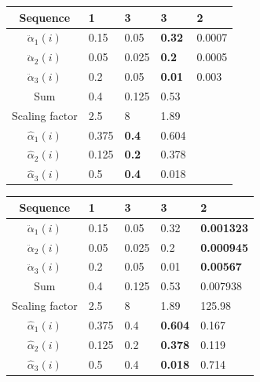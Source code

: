 \begin{frame}
\begin{table}[h]
\begin{tabular}{|c|l|l|l|l|}
 \hline
Sequence      & 1     & 3            & 3             & 2      \\ \hline
$\ddot{\alpha}_1(i)$          & 0.15  & 0.05         & \textbf{0.32} & 0.0007 \\ \hline
$\ddot{\alpha}_2(i)$          & 0.05  & 0.025        & \textbf{0.2}  & 0.0005 \\ \hline
$\ddot{\alpha}_3(i)$          & 0.2   & 0.05         & \textbf{0.01} & 0.003  \\ \hline
Sum            & 0.4   & 0.125        & 0.53          &        \\ \hline
Scaling factor & 2.5   & 8            & 1.89          &        \\ \hline
$\hat{\alpha}_1(i)$          & 0.375 & \textbf{0.4} & 0.604         &        \\ \hline
$\hat{\alpha}_2(i)$          & 0.125 & \textbf{0.2} & 0.378         &        \\ \hline
$\hat{\alpha}_3(i)$          & 0.5   & \textbf{0.4} & 0.018         &   	   \\ \hline    
\end{tabular}
\end{table}
\end{frame}

\begin{frame}
\begin{table}[h]
\begin{tabular}{|c|l|l|l|l|}
\hline
Sequence      & 1     & 3     & 3              & 2                 \\ \hline
$\ddot{\alpha}_1(i)$          & 0.15  & 0.05  & 0.32           & \textbf{0.001323} \\ \hline
$\ddot{\alpha}_2(i)$          & 0.05  & 0.025 & 0.2            & \textbf{0.000945} \\ \hline
$\ddot{\alpha}_3(i)$          & 0.2   & 0.05  & 0.01           & \textbf{0.00567}  \\ \hline
Sum            & 0.4   & 0.125 & 0.53           & 0.007938          \\ \hline
Scaling factor & 2.5   & 8     & 1.89           & 125.98            \\ \hline
$\hat{\alpha}_1(i)$          & 0.375 & 0.4   & \textbf{0.604} & 0.167             \\ \hline
$\hat{\alpha}_2(i)$          & 0.125 & 0.2   & \textbf{0.378} & 0.119             \\ \hline
$\hat{\alpha}_3(i)$          & 0.5   & 0.4   & \textbf{0.018} & 0.714             \\ \hline  
\end{tabular}
\end{table}
\end{frame}